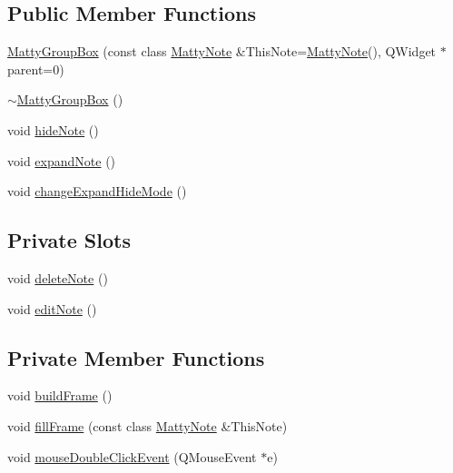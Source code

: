 \subsection*{Public Member Functions}
\begin{DoxyCompactItemize}
\item 
\hyperlink{classMattyGroupBox_a3445932bd0e2d39d640cc9457580c39e}{Matty\+Group\+Box} (const class \hyperlink{classMattyNote}{Matty\+Note} \&This\+Note=\hyperlink{classMattyNote}{Matty\+Note}(), Q\+Widget $\ast$parent=0)
\item 
\hyperlink{classMattyGroupBox_acf5f5023cf210a83e9846a35b149dd70}{$\sim$\+Matty\+Group\+Box} ()
\item 
void \hyperlink{classMattyGroupBox_ad96bd7663326b7b3e15c67455ccea32a}{hide\+Note} ()
\item 
void \hyperlink{classMattyGroupBox_a9797e81eba743d81cf8f45758921d8e7}{expand\+Note} ()
\item 
void \hyperlink{classMattyGroupBox_acb2b6f0d418195c1a9838f4c3565378f}{change\+Expand\+Hide\+Mode} ()
\end{DoxyCompactItemize}
\subsection*{Private Slots}
\begin{DoxyCompactItemize}
\item 
void \hyperlink{classMattyGroupBox_ac7b7f1db6ea96e4c4b0f58fb87f86900}{delete\+Note} ()
\item 
void \hyperlink{classMattyGroupBox_a446df41d130f1d6a411f35d80d62b055}{edit\+Note} ()
\end{DoxyCompactItemize}
\subsection*{Private Member Functions}
\begin{DoxyCompactItemize}
\item 
void \hyperlink{classMattyGroupBox_ae9862aae672bd2cf4a99da541beef696}{build\+Frame} ()
\item 
void \hyperlink{classMattyGroupBox_a982e84ed3ae5f61b542269e9b5e8ebba}{fill\+Frame} (const class \hyperlink{classMattyNote}{Matty\+Note} \&This\+Note)
\item 
void \hyperlink{classMattyGroupBox_af5eee7ea107159615e3d23dd43cc9ff4}{mouse\+Double\+Click\+Event} (Q\+Mouse\+Event $\ast$e)
\end{DoxyCompactItemize}
